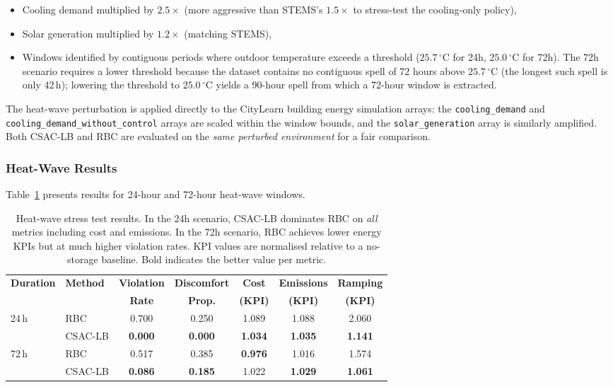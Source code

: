 \begin{itemize}
  \item Cooling demand multiplied by $2.5\times$ (more aggressive than STEMS's
    $1.5\times$ to stress-test the cooling-only policy),
  \item Solar generation multiplied by $1.2\times$ (matching STEMS),
  \item Windows identified by contiguous periods where outdoor temperature
    exceeds a threshold ($25.7\,^\circ$C for 24h, $25.0\,^\circ$C for 72h).
    The 72h scenario requires a lower threshold because the dataset contains
    no contiguous spell of 72 hours above $25.7\,^\circ$C (the longest such
    spell is only 42\,h); lowering the threshold to $25.0\,^\circ$C yields a
    90-hour spell from which a 72-hour window is extracted.
\end{itemize}

The heat-wave perturbation is applied directly to the CityLearn building energy
simulation arrays: the \texttt{cooling\_demand} and
\texttt{cooling\_demand\_without\_control} arrays are scaled within the window
bounds, and the \texttt{solar\_generation} array is similarly amplified.  Both
CSAC-LB and RBC are evaluated on the \emph{same perturbed environment}
for a fair comparison.

\subsubsection{Heat-Wave Results}

Table~\ref{tab:temp-heatwave} presents results for 24-hour and 72-hour
heat-wave windows.

\begin{table}[htbp]
\centering
\caption{Heat-wave stress test results.  In the 24h scenario, CSAC-LB
  dominates RBC on \emph{all} metrics including cost and emissions.  In
  the 72h scenario, RBC achieves lower energy KPIs but at much higher
  violation rates.  KPI values are normalised relative to a no-storage
  baseline.  Bold indicates the better value per metric.}
\label{tab:temp-heatwave}
\begin{tabular}{llccccc}
\toprule
\textbf{Duration}
  & \textbf{Method}
  & \textbf{Violation}
  & \textbf{Discomfort}
  & \textbf{Cost}
  & \textbf{Emissions}
  & \textbf{Ramping} \\
  & & \textbf{Rate} & \textbf{Prop.} & \textbf{(KPI)} & \textbf{(KPI)} & \textbf{(KPI)} \\
\midrule
\multirow{2}{*}{24\,h}
  & RBC     & 0.700 & 0.250 & 1.089 & 1.088 & 2.060 \\
  & CSAC-LB & \textbf{0.000} & \textbf{0.000} & \textbf{1.034} & \textbf{1.035} & \textbf{1.141} \\
\midrule
\multirow{2}{*}{72\,h}
  & RBC     & 0.517 & 0.385 & \textbf{0.976} & 1.016 & 1.574 \\
  & CSAC-LB & \textbf{0.086} & \textbf{0.185} & 1.022 & \textbf{1.029} & \textbf{1.061} \\
\bottomrule
\end{tabular}
\end{table}

